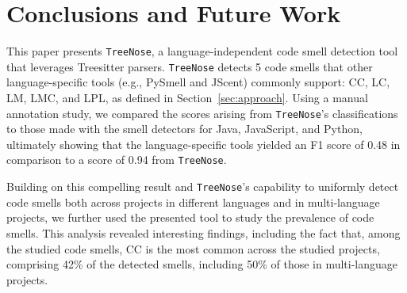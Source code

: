\section{Conclusions and Future Work}






This paper presents \texttt{TreeNose}, a language-independent code smell
detection tool that leverages Treesitter parsers. \texttt{TreeNose} detects 5
code smells that other language-specific tools (e.g., PySmell and JScent)
commonly support: CC, LC, LM, LMC, and LPL, as defined in
Section~\ref{sec:approach}.
%
Using a manual annotation study, we compared the scores arising from
\texttt{TreeNose}'s classifications to those made with the smell detectors for
Java, JavaScript, and Python,
%
ultimately showing that the language-specific tools yielded an F1 score of 0.48
in comparison to a score of 0.94 from \texttt{TreeNose}.

Building on this compelling result and \texttt{TreeNose}'s capability to
uniformly detect code smells both across projects in different languages and in
multi-language projects, we further used the presented tool to study the
prevalence of code smells.
%
This analysis revealed interesting findings, including the fact that, among the
studied code smells, CC is the most common across the studied projects,
comprising 42\% of the detected smells, including 50\% of those in
multi-language projects.

